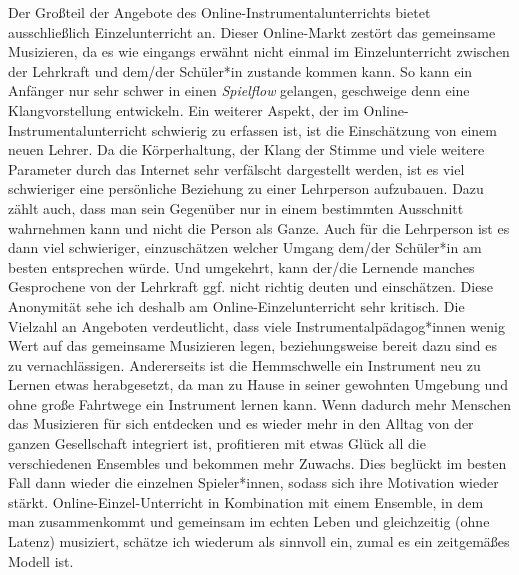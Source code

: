 Der Großteil der Angebote des Online-Instrumentalunterrichts bietet
ausschließlich Einzelunterricht an. Dieser Online-Markt zestört das gemeinsame
Musizieren, da es wie eingangs erwähnt nicht einmal im Einzelunterricht zwischen
der Lehrkraft und dem/der Schüler*in zustande kommen kann. So kann ein Anfänger
nur sehr schwer in einen \emph{Spielflow} gelangen, geschweige denn eine
Klangvorstellung entwickeln. Ein weiterer Aspekt, der im
Online-Instrumentalunterricht schwierig zu erfassen ist, ist die Einschätzung
von einem neuen Lehrer. Da die Körperhaltung, der Klang der Stimme und viele
weitere Parameter durch das Internet sehr verfälscht dargestellt werden, ist es
viel schwieriger eine persönliche Beziehung zu einer Lehrperson aufzubauen. Dazu
zählt auch, dass man sein Gegenüber nur in einem bestimmten Ausschnitt
wahrnehmen kann und nicht die Person als Ganze. Auch für die Lehrperson ist es
dann viel schwieriger, einzuschätzen welcher Umgang dem/der Schüler*in am besten
entsprechen würde. Und umgekehrt, kann der/die Lernende manches Gesprochene von
der Lehrkraft ggf. nicht richtig deuten und einschätzen. Diese Anonymität sehe
ich deshalb am Online-Einzelunterricht sehr kritisch. Die Vielzahl an Angeboten
verdeutlicht, dass viele Instrumentalpädagog*innen wenig Wert auf das gemeinsame
Musizieren legen, beziehungsweise bereit dazu sind es zu vernachlässigen.
Andererseits ist die Hemmschwelle ein Instrument neu zu Lernen etwas
herabgesetzt, da man zu Hause in seiner gewohnten Umgebung und ohne große
Fahrtwege ein Instrument lernen kann. Wenn dadurch mehr Menschen das Musizieren
für sich entdecken und es wieder mehr in den Alltag von der ganzen Gesellschaft
integriert ist, profitieren mit etwas Glück all die verschiedenen Ensembles und
bekommen mehr Zuwachs. Dies beglückt im besten Fall dann wieder die einzelnen
Spieler*innen, sodass sich ihre Motivation wieder stärkt.
Online-Einzel-Unterricht in Kombination mit einem Ensemble, in dem man
zusammenkommt und gemeinsam im echten Leben und gleichzeitig (ohne Latenz)
musiziert, schätze ich wiederum als sinnvoll ein, zumal es ein zeitgemäßes Modell ist.

